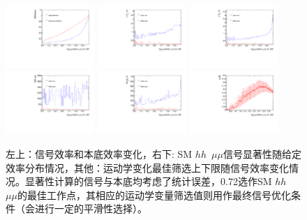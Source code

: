 \begin{figure}[h]
\begin{center}
\includegraphics[width = 0.3\textwidth,angle=-90]{fig/SigOpt/nonres/Efficiency_mumu.pdf}
\includegraphics[width = 0.3\textwidth,angle=-90]{fig/SigOpt/nonres/mindR_l2j_mumu.pdf}
\includegraphics[width = 0.3\textwidth,angle=-90]{fig/SigOpt/nonres/mindR_l1j_mumu.pdf}
\includegraphics[width = 0.3\textwidth,angle=-90]{fig/SigOpt/nonres/m_ll_mumu.pdf}
\includegraphics[width = 0.3\textwidth,angle=-90]{fig/SigOpt/nonres/m_l1jj_mumu.pdf}
\includegraphics[width = 0.3\textwidth,angle=-90]{fig/SigOpt/nonres/SOverRootB_mumu.pdf}
\caption{左上：信号效率和本底效率变化，右下: SM $hh$~$\mu\mu$信号显著性随给定效率分布情况，其他：运动学变化最佳筛选上下限随信号效率变化情况。显著性计算的信号与本底均考虑了统计误差，0.72选作SM $hh$~$\mu\mu$的最佳工作点，其相应的运动学变量筛选值则用作最终信号优化条件（会进行一定的平滑性选择）。}
\label{fig:nonres:SigOpt_mumu}
\end{center}
\end{figure}

